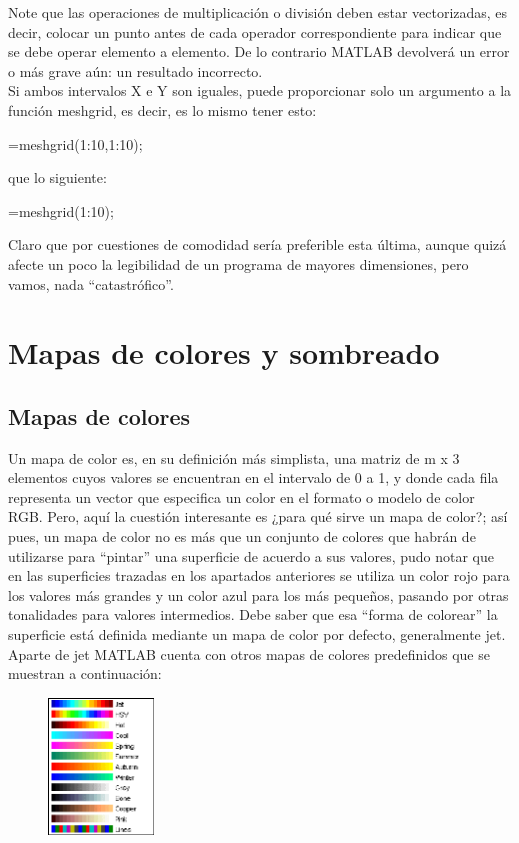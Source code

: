 Note que las operaciones de multiplicación o división deben estar
vectorizadas, es decir, colocar un punto antes de cada operador
correspondiente para indicar que se debe operar elemento a elemento. De
lo contrario MATLAB devolverá un error o más grave aún: un resultado
incorrecto. \\

Si ambos intervalos X e Y son iguales, puede proporcionar solo un
argumento a la función meshgrid, es decir, es lo mismo tener esto:

\begin{matlab}
[X,Y]=meshgrid(1:10,1:10);
\end{matlab}

que lo siguiente:

\begin{matlab}
[X,Y]=meshgrid(1:10);
\end{matlab}

Claro que por cuestiones de comodidad sería preferible esta última,
aunque quizá afecte un poco la legibilidad de un programa de mayores
dimensiones, pero vamos, nada ``catastrófico''.

\section{Mapas de colores y sombreado}

\subsection{Mapas de colores}

Un mapa de color es, en su definición más simplista, una matriz de m x 3
elementos cuyos valores se encuentran en el intervalo de 0 a 1, y donde
cada fila representa un vector que especifica un color en el formato o
modelo de color RGB. Pero, aquí la cuestión interesante es ¿para qué
sirve un mapa de color?; así pues, un mapa de color no es más que un
conjunto de colores que habrán de utilizarse para ``pintar'' una
superficie de acuerdo a sus valores, pudo notar que en las superficies
trazadas en los apartados anteriores se utiliza un color rojo para los
valores más grandes y un color azul para los más pequeños, pasando por
otras tonalidades para valores intermedios. Debe saber que esa ``forma
de colorear'' la superficie está definida mediante un mapa de color por
defecto, generalmente jet. Aparte de jet MATLAB cuenta con otros mapas
de colores predefinidos que se muestran a continuación:

\begin{figure}[htbp]
\centering
\includegraphics[width=0.25\textwidth]{src/img/ch4/img_4_9.png}
\caption{}
\end{figure}

